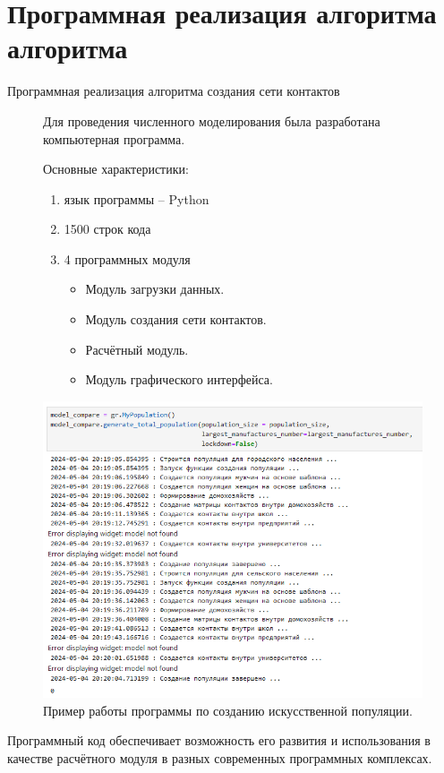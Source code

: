 \documentclass[10pt, unicode, xcolor={svgnames, table, hyperref}]{beamer}
\begin{document}
\section{\small Программная реализация алгоритма алгоритма}
\begin{frame}[fragile]{Программная реализация алгоритма создания сети контактов}

	\begin{figure}[h!]
		\begin{minipage}{0.49\textwidth}
			\small
			Для проведения численного моделирования была разработана компьютерная
			программа.
			
			Основные характеристики:
			\begin{enumerate}
				\item язык программы -- Python
				\item 1500 строк кода
				\item 4 программных модуля
				\begin{itemize}
					\item Модуль загрузки данных.
					\item Модуль создания сети контактов.
					\item Расчётный модуль.
					\item Модуль графического интерфейса.
				\end{itemize}
				
			\end{enumerate}
		\end{minipage}
		\begin{minipage}{0.48\textwidth}

			\includegraphics[width=1.\textwidth]{img/прога.png}
			Пример работы программы по созданию искусственной популяции.
		\end{minipage}
	\end{figure}
	Программный код  обеспечивает
	возможность его развития и использования в качестве расчётного модуля в разных современных программных комплексах.
	
\end{frame}
\end{document}
